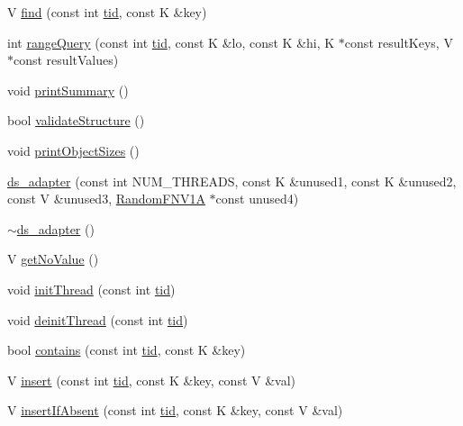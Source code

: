 \begin{DoxyCompactItemize}
\item 
V \hyperlink{classds__adapter_a0109b0d011810f687c9e9273eb1d1bc8}{find} (const int \hyperlink{microbench_2main_8cpp_a9ca9869868fe7e7a38a921cc7de4103f}{tid}, const K \&key)
\item 
int \hyperlink{classds__adapter_a23a9c8db5425e98a93d647df1c6c23dd}{range\+Query} (const int \hyperlink{microbench_2main_8cpp_a9ca9869868fe7e7a38a921cc7de4103f}{tid}, const K \&lo, const K \&hi, K $\ast$const result\+Keys, V $\ast$const result\+Values)
\item 
void \hyperlink{classds__adapter_aac97293215557665d2ef1e1a0d06fcfd}{print\+Summary} ()
\item 
bool \hyperlink{classds__adapter_ae50fe8a8683c0278cdd4c45e1405860d}{validate\+Structure} ()
\item 
void \hyperlink{classds__adapter_a33b13b7059a8c0345fb59a324dc3a691}{print\+Object\+Sizes} ()
\item 
\hyperlink{classds__adapter_ab37964787a66459a325cf75ac91da4e8}{ds\+\_\+adapter} (const int N\+U\+M\+\_\+\+T\+H\+R\+E\+A\+DS, const K \&unused1, const K \&unused2, const V \&unused3, \hyperlink{classRandomFNV1A}{Random\+F\+N\+V1A} $\ast$const unused4)
\item 
\hyperlink{classds__adapter_a366f46dd39d59f2d4a147589f5fd98e3}{$\sim$ds\+\_\+adapter} ()
\item 
V \hyperlink{classds__adapter_a9e1e4aec136b351d1a6820d70484a6c5}{get\+No\+Value} ()
\item 
void \hyperlink{classds__adapter_a3733f6a6b57312b1b5e4fb5181d82a0b}{init\+Thread} (const int \hyperlink{microbench_2main_8cpp_a9ca9869868fe7e7a38a921cc7de4103f}{tid})
\item 
void \hyperlink{classds__adapter_a173ca48b19fc1dc346159ea582c690cd}{deinit\+Thread} (const int \hyperlink{microbench_2main_8cpp_a9ca9869868fe7e7a38a921cc7de4103f}{tid})
\item 
bool \hyperlink{classds__adapter_aecf1899dbe9fae93c72ee2b5549cf6eb}{contains} (const int \hyperlink{microbench_2main_8cpp_a9ca9869868fe7e7a38a921cc7de4103f}{tid}, const K \&key)
\item 
V \hyperlink{classds__adapter_a6c0fc676d77e30e14946baf325174739}{insert} (const int \hyperlink{microbench_2main_8cpp_a9ca9869868fe7e7a38a921cc7de4103f}{tid}, const K \&key, const V \&val)
\item 
V \hyperlink{classds__adapter_ae9cb29ad0c0338c0e1d12ef97e008135}{insert\+If\+Absent} (const int \hyperlink{microbench_2main_8cpp_a9ca9869868fe7e7a38a921cc7de4103f}{tid}, const K \&key, const V \&val)

\end{DoxyCompactItemize}
